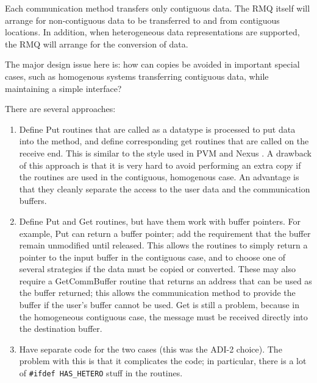 \documentclass{article}
\let\code=\texttt
\begin{document}
Each communication method transfers only contiguous data.  The RMQ itself will
arrange for non-contiguous data to be transferred to and from contiguous
locations.  In addition, when heterogeneous data representations are
supported, the RMQ will arrange for the conversion of data.  

The major design issue here is: how can copies be avoided in important special
cases, such as homogenous systems transferring contiguous data, while
maintaining a simple interface?

There are several approaches:
\begin{enumerate}
\item Define Put routines that are called as a datatype is processed to put
  data into the method, and define corresponding get routines that are called
  on the receive end.  This is similar to the style used in PVM
  \cite{pvm-book} and Nexus \cite{nexus-manual}.  A drawback of this approach
  is that it is very hard to avoid performing an extra copy if the routines
  are used in the contiguous, homogenous case.  An advantage is that they
  cleanly separate the access to the user data and the communication buffers.

\item Define Put and Get routines, but have them work with buffer pointers.
  For example, Put can return a buffer pointer; add
  the requirement that the buffer remain unmodified until released.
  This allows the routines to simply return a pointer to the input buffer in
  the contiguous case, and to choose one of several strategies if the data
  must be copied or converted.  These may also require a GetCommBuffer routine
  that returns an address that can be used as the buffer returned; this allows
  the communication method to provide the buffer if the user's buffer cannot
  be used.  Get is still a problem, because in the homogeneous contiguous
  case,  the message must be received directly into the destination buffer.

\item Have separate code for the two cases (this was the ADI-2 choice).  The
  problem with this is that it complicates the code; in particular, there is a
  lot of \code{\#ifdef HAS\_HETERO} stuff in the routines.
\end{enumerate}
\end{document}
